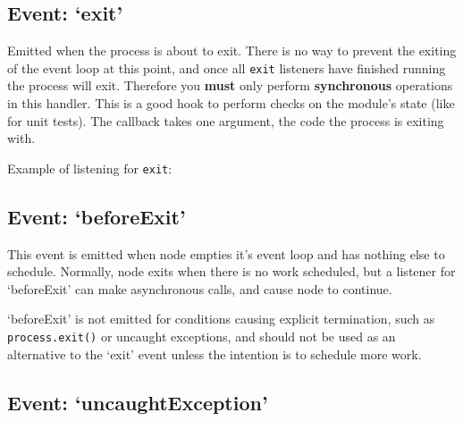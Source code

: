 \subsection{Event: `exit'}\label{event-exit}

Emitted when the process is about to exit. There is no way to prevent
the exiting of the event loop at this point, and once all \texttt{exit}
listeners have finished running the process will exit. Therefore you
\textbf{must} only perform \textbf{synchronous} operations in this
handler. This is a good hook to perform checks on the module's state
(like for unit tests). The callback takes one argument, the code the
process is exiting with.

Example of listening for \texttt{exit}:

\begin{Shaded}
\begin{Highlighting}[]
\NormalTok{(}\NormalTok{, }
  \NormalTok{(}\NormalTok{() \{}
    \NormalTok{(}\NormalTok{);}
  \NormalTok{\}, }\NormalTok{);}
  \NormalTok{(}
\NormalTok{\});}
\end{Highlighting}
\end{Shaded}

\subsection{Event: `beforeExit'}\label{event-beforeexit}

This event is emitted when node empties it's event loop and has nothing
else to schedule. Normally, node exits when there is no work scheduled,
but a listener for `beforeExit' can make asynchronous calls, and cause
node to continue.

`beforeExit' is not emitted for conditions causing explicit termination,
such as \texttt{process.exit()} or uncaught exceptions, and should not
be used as an alternative to the `exit' event unless the intention is to
schedule more work.

\subsection{Event: `uncaughtException'}\label{event-uncaughtexception}

